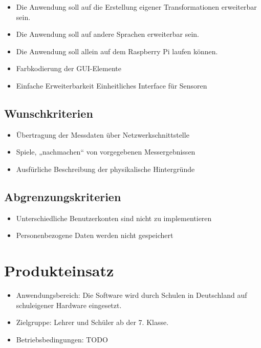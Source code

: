 \documentclass[parskip=full]{scrartcl}
\begin{document}
\begin{itemize}

\item Die Anwendung soll auf die Erstellung eigener Transformationen erweiterbar sein.
\item Die Anwendung soll auf andere Sprachen erweiterbar sein.
\item Die Anwendung soll allein auf dem Raspberry Pi laufen können.
\item Farbkodierung der GUI-Elemente
\item Einfache Erweiterbarkeit
\subitem Einheitliches Interface für Sensoren


 \end{itemize}

\subsection{Wunschkriterien}

\begin{itemize}

\item Übertragung der Messdaten über Netzwerkschnittstelle
\item Spiele, „nachmachen“ von vorgegebenen Messergebnissen
\item Ausfürliche Beschreibung der physikalische Hintergründe

 \end{itemize}

\subsection{Abgrenzungskriterien}

\begin{itemize}

\item Unterschiedliche Benutzerkonten sind nicht zu implementieren
\item Personenbezogene Daten werden nicht gespeichert

 \end{itemize}

\section{Produkteinsatz}

\begin{itemize}

\item Anwendungsbereich: Die Software wird durch Schulen in Deutschland auf schuleigener Hardware eingesetzt.
\item Zielgruppe: Lehrer und Schüler ab der 7. Klasse.
\item Betriebsbedingungen: TODO

\end{itemize}
\end{document}
